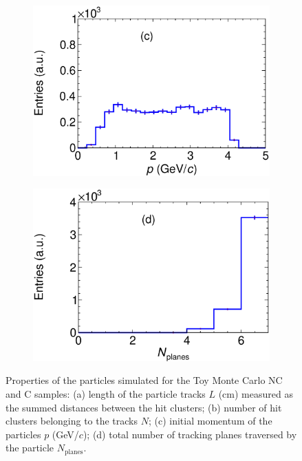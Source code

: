 \begin{figure}[t]
\begin{subfigure}[b]{0.48\textwidth}
         \includegraphics[width=\textwidth]{figures/ch4-KF_NDGArLite/Toy/pAllTall.eps}
         \caption{}
         \label{fig:ToyGArLite_p}
     \end{subfigure}
     \begin{subfigure}[b]{0.48\textwidth}
         \centering
         \includegraphics[width=\textwidth]{figures/ch4-KF_NDGArLite/Toy/NPlanesAllTall.eps}
         \caption{}
         \label{fig:ToyGArLite_planes}
     \end{subfigure}
        \caption[Properties of the particles simulated for the Toy Monte Carlo NC and C samples.]{Properties of the particles simulated for the Toy Monte Carlo NC and C samples: (a) length of the particle tracks $L$ (cm) measured as the summed distances between the hit clusters; (b) number of hit clusters belonging to the tracks $N$; (c) initial momentum of the particles $p$ (GeV/$c$); (d) total number of tracking planes traversed by the particle $N_\text{planes}.$} \label{fig:ToyGArLite_prop}
\end{figure}

